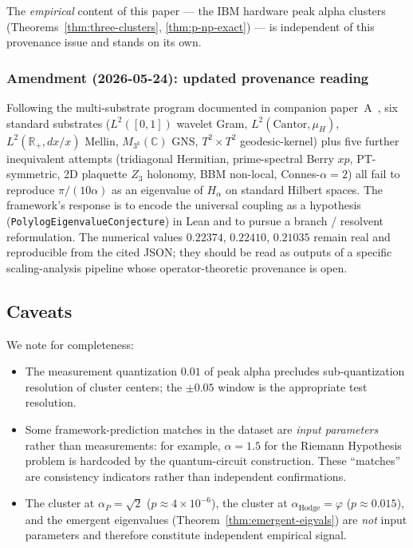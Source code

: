 \documentclass[11pt,a4paper]{article}
\theoremstyle{definition}
\begin{document}
The \emph{empirical} content of this paper --- the IBM hardware peak
alpha clusters (Theorems~\ref{thm:three-clusters}, \ref{thm:p-np-exact}) ---
is independent of this provenance issue and stands on its own.

\subsubsection*{Amendment (2026-05-24): updated provenance reading}

Following the multi-substrate program documented in companion
paper~A~\cite{cohen2025framework_paperA}, six standard substrates
($L^2([0,1])$ wavelet Gram, $L^2(\text{Cantor},\mu_H)$,
$L^2(\mathbb{R}_+, dx/x)$ Mellin, $M_{3^k}(\mathbb{C})$ GNS, $T^2 \times T^2$
geodesic-kernel) plus five further inequivalent attempts (tridiagonal
Hermitian, prime-spectral Berry $xp$, PT-symmetric, 2D plaquette $Z_3$
holonomy, BBM non-local, Connes-$\alpha=2$) all fail to reproduce
$\pi/(10\alpha)$ as an eigenvalue of $H_\alpha$ on standard Hilbert
spaces. The framework's response is to encode the universal coupling
as a hypothesis (\texttt{PolylogEigenvalueConjecture}) in Lean and to
pursue a branch / resolvent reformulation. The numerical values
$0.22374$, $0.22410$, $0.21035$ remain real and reproducible from the
cited JSON; they should be read as outputs of a specific
scaling-analysis pipeline whose operator-theoretic provenance is open.

\subsection{Caveats}

We note for completeness:
\begin{itemize}
\item The measurement quantization $0.01$ of peak alpha precludes
sub-quantization resolution of cluster centers; the $\pm 0.05$
window is the appropriate test resolution.
\item Some framework-prediction matches in the dataset are
\emph{input parameters} rather than measurements: for example, $\alpha
= 1.5$ for the Riemann Hypothesis problem is hardcoded by the
quantum-circuit construction. These ``matches'' are consistency
indicators rather than independent confirmations.
\item The cluster at $\alpha_P = \sqrt{2}$ ($p \approx 4 \times 10^{-6}$),
the cluster at $\alpha_{\mathrm{Hodge}} = \varphi$
($p \approx 0.015$), and the emergent eigenvalues
(Theorem~\ref{thm:emergent-eigvals}) are \emph{not} input parameters
and therefore constitute independent empirical signal.
\end{itemize}
\end{document}
